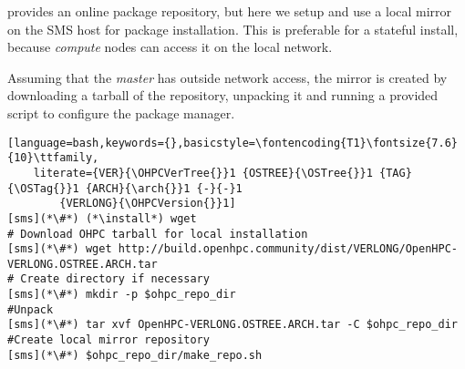 \OHPC{} provides an online package repository, but here we setup and use a local
mirror on the SMS host for \OHPC{} package installation. This is preferable for
a stateful install, because {\em compute} nodes can access it on the local
network.  


Assuming that the {\em master} has outside network access, the mirror is
created  by downloading a tarball of the repository, unpacking it and running a
provided script to configure the package manager.

\begin{lstlisting}[language=bash,keywords={},basicstyle=\fontencoding{T1}\fontsize{7.6}{10}\ttfamily,
	literate={VER}{\OHPCVerTree{}}1 {OSTREE}{\OSTree{}}1 {TAG}{\OSTag{}}1 {ARCH}{\arch{}}1 {-}{-}1 
        {VERLONG}{\OHPCVersion{}}1]
[sms](*\#*) (*\install*) wget
# Download OHPC tarball for local installation
[sms](*\#*) wget http://build.openhpc.community/dist/VERLONG/OpenHPC-VERLONG.OSTREE.ARCH.tar
# Create directory if necessary
[sms](*\#*) mkdir -p $ohpc_repo_dir
#Unpack
[sms](*\#*) tar xvf OpenHPC-VERLONG.OSTREE.ARCH.tar -C $ohpc_repo_dir
#Create local mirror repository
[sms](*\#*) $ohpc_repo_dir/make_repo.sh
\end{lstlisting}
